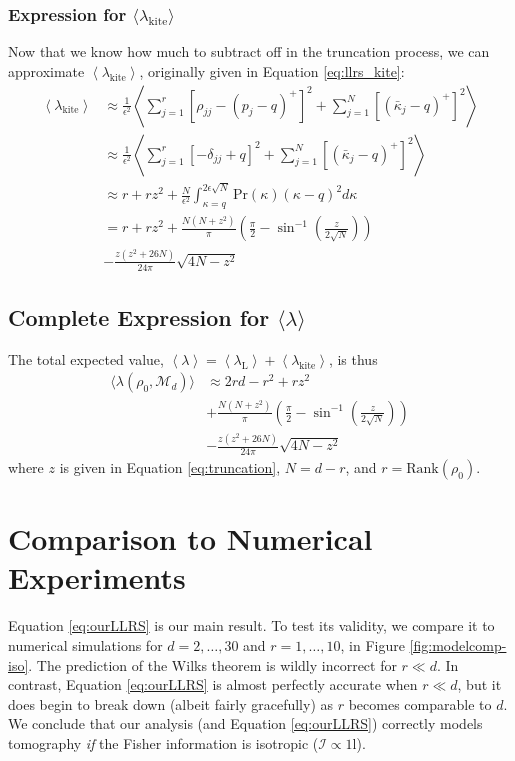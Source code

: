 \documentclass[aps,pra, twocolumn]{revtex4-1}
\newcommand{\M}{\mathcal{M}}
\newcommand{\Id}{\mathbb{I}}
\newcommand{\expect}[1]{\ensuremath{\left\langle#1\right\rangle}}
\def\Id{1\!\mathrm{l}}
\newcommand{\Fi}{\mathcal{I}}
\begin{document}
\subsubsection{Expression for $\langle \lambda_{\mathrm{kite}}\rangle$}
Now that we know how much to subtract off in the truncation process, we can approximate $\expect{\lambda_{\mathrm{kite}}}$, originally given in Equation \eqref{eq:llrs_kite}:
\begin{align}
\nonumber \expect{\lambda_{\mathrm{kite}}} &\approx  \frac{1}{\epsilon^{2}}\left\langle\sum_{j=1}^{r}[\rho_{jj}- (p_j-q)^{+}]^2 + \sum_{j=1}^{N}\left[(\bar{\kappa}_j-q)^+\right]^2 \right\rangle\\
\nonumber &\approx \frac{1}{\epsilon^{2}} \left\langle\sum_{j=1}^{r}[-\delta_{jj} +  q ]^2 + \sum_{j=1}^{N}\left[(\bar{\kappa}_j-q)^+\right]^2 \right\rangle\\
\nonumber  &\approx r + rz^2 + \frac{N}{\epsilon^{2}}\int_{\kappa=q}^{2\epsilon\sqrt{N}}{ \mathrm{Pr}(\kappa)(\kappa-q)^2 d\kappa} \\
\nonumber &=r + rz^{2} + \frac{N(N+z^{2})}{\pi}\left(\frac{\pi}{2} - \sin^{-1}\left(\frac{z}{2\sqrt{N}}\right)\right) \\
& - \frac{z(z^{2}+26N)}{24\pi}\sqrt{4N-z^{2}}
\end{align}

\subsection{Complete Expression for $\langle \lambda \rangle$}
\label{subsec:LLRS}
The total expected value, $\expect{\lambda} = \expect{\lambda_{\mathrm{L}}} + \expect{\lambda_{\mathrm{kite}}}$, is thus
\begin{align}
\label{eq:ourLLRS}
\nonumber \langle \lambda(\rho_{0}, \M_{d}) \rangle &\approx 2rd - r^{2}+rz^{2}\\
\nonumber & + \frac{N(N+z^{2})}{\pi}\left(\frac{\pi}{2} - \sin^{-1}\left(\frac{z}{2\sqrt{N}}\right)\right) \\
& - \frac{z(z^{2}+26N)}{24\pi}\sqrt{4N-z^{2}}
\end{align}
where $z$ is given in Equation \eqref{eq:truncation}, $N=d-r$, and $r = \mathrm{Rank}(\rho_{0})$.

\section{Comparison to Numerical Experiments}
\label{sec:theorycomparison}

Equation \eqref{eq:ourLLRS} is our main result.  To test its validity, we compare it to numerical simulations for $d=2,\ldots,30$ and $r=1,\ldots,10$, in Figure \ref{fig:modelcomp-iso}.  The prediction of the Wilks theorem is wildly incorrect for $r\ll d$. In contrast, Equation \eqref{eq:ourLLRS} is almost perfectly accurate when $r \ll d$, but it does begin to break down (albeit fairly gracefully) as $r$ becomes comparable to $d$.  We conclude that our analysis (and Equation \eqref{eq:ourLLRS}) correctly models tomography \emph{if} the Fisher information is isotropic ($\Fi \propto \Id$).
\end{document}
